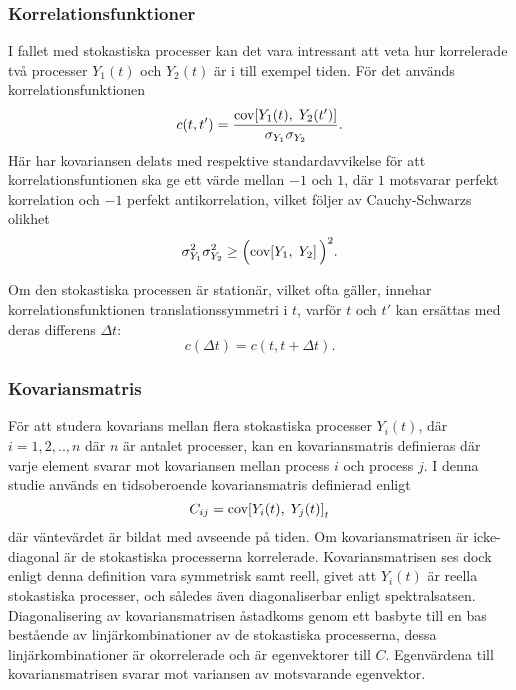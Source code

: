 \subsubsection{Korrelationsfunktioner}
I fallet med stokastiska processer kan det vara intressant att veta
hur korrelerade två processer $Y_1(t)$ och $Y_2(t)$ är i till exempel tiden. För det används
korrelationsfunktionen 
\begin{equation}\label{eq:CORR}
c(t, t') = \frac{\text{cov}\!\left[Y_1(t),\;Y_2(t')\right]}{\sigma_{Y_1}\sigma_{Y_2}}.
\end{equation}
Här har kovariansen delats med respektive standardavvikelse för att
korrelationsfuntionen ska ge ett värde mellan $-1$ och $1$, där $1$ motsvarar perfekt korrelation och $-1$ perfekt antikorrelation, vilket följer av Cauchy-Schwarzs\cite{Engelberg_noise2007} olikhet 
\begin{equation}
\sigma_{Y_1}^2\sigma_{Y_2}^2\geq \Big(\text{cov}\!\left[Y_1,\;Y_2\right]\Big)^2.
\end{equation}

Om den stokastiska processen är stationär, vilket ofta gäller, innehar korrelationsfunktionen
translationssymmetri i $t$, varför $t$ och $t'$ kan ersättas med deras differens $\Delta t$:
\begin{equation}
c(\Delta t) = c(t, t+\Delta t).
\end{equation}

\subsubsection{Kovariansmatris}\label{sec:kovmatris}
För att studera kovarians mellan flera stokastiska processer $Y_i(t)$, där $i=1,2,..,n$ där $n$ är antalet processer, kan en kovariansmatris definieras där varje element svarar mot kovariansen mellan process $i$ och process $j$. I denna studie används en tidsoberoende kovariansmatris definierad enligt 
\begin{equation}
\label{eq:kovmatris}
    C_{ij} = \text{cov}\!\left[Y_i(t),\;Y_j(t)\right]_t
\end{equation}
där väntevärdet är bildat med avseende på tiden. Om kovariansmatrisen är icke-diagonal är de stokastiska processerna korrelerade. Kovariansmatrisen ses dock enligt denna definition vara symmetrisk samt reell, givet att $Y_i(t)$ är reella stokastiska processer, och således även diagonaliserbar enligt spektralsatsen.  Diagonalisering av kovariansmatrisen åstadkoms genom ett basbyte till en bas bestående av linjärkombinationer av de stokastiska processerna, dessa linjärkombinationer är okorrelerade och är egenvektorer\cite{Shlens_PCA2014} till $C$. Egenvärdena till kovariansmatrisen svarar mot variansen av motsvarande egenvektor.


